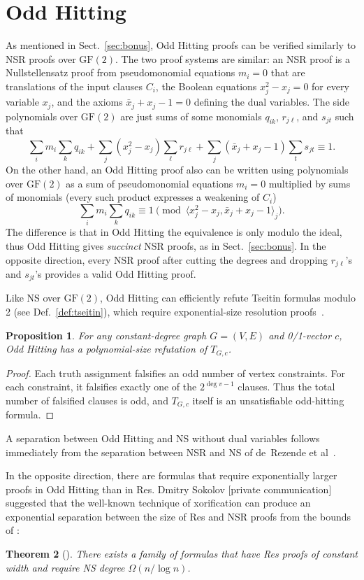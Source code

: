 \documentclass[11pt]{article}
\newcommand{\scterm}[1]{{\textrm{\sc #1}}}
\newcommand{\hit}{\scterm{Hitting}}
\newcommand{\res}{\scterm{Res}}
\newcommand{\ns}{\scterm{NS}}
\newcommand{\nsr}{\scterm{NSR}}
\newcommand{\hitodd}{\scterm{Odd} {\hit}}
\newcommand{\GF}{\mathrm{GF}}
\numberwithin{equation}{section}
\newtheorem{theorem}{Theorem}[section]
\newtheorem{proposition}[theorem]{Proposition}
\begin{document}
\section{\hitodd}\label{sec:odd-hitting}
As mentioned in Sect.~\ref{sec:bonus}, {\hitodd} proofs can be verified
similarly to {\nsr} proofs over $\GF(2)$. The two proof systems are similar:
an {\nsr} proof is a Nullstellensatz proof from pseudomonomial equations $m_i=0$
that are translations of the input clauses $C_i$, the Boolean equations
$x_j^2-x_j=0$ for every variable $x_j$, and the axioms $\bar x_j + x_j - 1 = 0$
defining the dual variables. The side polynomials over $\GF(2)$
are just sums of some monomials $q_{ik}$, $r_{j\ell} $, and $s_{jt}$ such that
\[
\sum_i m_i\sum_k q_{ik} +
\sum_j (x_j^2-x_j)\sum_\ell r_{j\ell} +
\sum_j (\bar x_j + x_j - 1)\sum_t s_{jt} 
\equiv 1.
\]
On the other hand, an {\hitodd} proof also can be written using polynomials
over $\GF(2)$ as a sum of
pseudomonomial equations $m_i=0$ multiplied by sums of monomials
(every such product expresses a weakening of $C_i$)
\[\sum_i m_i\sum_k q_{ik} \equiv 1 \pmod {\langle x_j^2-x_j, \bar x_j + x_j - 1\rangle_j}.\]
The difference is that in {\hitodd} the equivalence is only modulo the ideal,
thus {\hitodd} gives \emph{succinct} {\nsr} proofs, as in Sect.~\ref{sec:bonus}.
In the opposite direction,
every {\nsr} proof after cutting the degrees and dropping
$r_{j\ell}$'s and $s_{jt}$'s provides a valid {\hitodd} proof.

Like {\ns} over $\GF(2)$, {\hitodd} can efficiently refute Tseitin formulas modulo 2 (see Def.~\ref{def:tseitin}),
which require exponential-size resolution proofs~\cite{Urq87}.
\begin{proposition}\label{prop:hitodd-tseitin}
For any constant-degree graph $G=(V,E)$ and 0/1-vector $c$,
{\hitodd} has a polynomial-size refutation of $T_{G,c}$.
\end{proposition}
\begin{proof}
Each truth assignment falsifies an odd number of vertex constraints.
For each constraint, it falsifies exactly one of the $2^{\deg v - 1}$ clauses.
Thus the total number of falsified clauses is odd,
and $T_{G,c}$ itself is an unsatisfiable odd-hitting formula.
\end{proof}

A separation between {\hitodd} and {\ns} without dual variables follows immediately from
the separation between {\nsr} and {\ns} of de~Rezende et al~\cite{dRLNS21}.

In the opposite direction, there are formulas
that require exponentially larger proofs in {\hitodd} than in {\res}.
%
Dmitry Sokolov [private communication] suggested that the well-known technique of xorification can
produce an exponential separation between the size of {\res} and {\nsr} proofs from the bounds of \cite{BOPCI00}:
\begin{theorem}[\cite{BOPCI00}]
  \label{th:BOPCI00}
  There exists a family of formulas that have {\res} proofs of constant width and require {\ns} degree $\Omega(n/\log n)$.
\end{theorem}
\end{document}
